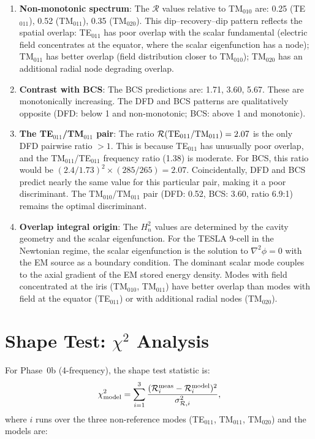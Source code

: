 \documentclass[11pt]{article}
\newcommand{\Heff}{H_n}
\theoremstyle{definition}
\theoremstyle{remark}
\begin{document}
\begin{enumerate}
\item \textbf{Non-monotonic spectrum}: The $\mathcal{R}$ values
  relative to TM$_{010}$ are: 0.25 (TE$_{011}$), 0.52 (TM$_{011}$),
  0.35 (TM$_{020}$). This dip--recovery--dip pattern reflects the
  spatial overlap: TE$_{011}$ has poor overlap with the scalar
  fundamental (electric field concentrates at the equator, where the
  scalar eigenfunction has a node); TM$_{011}$ has better overlap
  (field distribution closer to TM$_{010}$); TM$_{020}$ has an
  additional radial node degrading overlap.

\item \textbf{Contrast with BCS}: The BCS predictions are:
  1.71, 3.60, 5.67. These are monotonically increasing. The DFD
  and BCS patterns are qualitatively opposite (DFD: below 1 and
  non-monotonic; BCS: above 1 and monotonic).

\item \textbf{The TE$_{011}$/TM$_{011}$ pair}: The ratio
  $\mathcal{R}({\rm TE}_{011}/{\rm TM}_{011}) = 2.07$ is the only
  DFD pairwise ratio $> 1$. This is because TE$_{011}$ has unusually
  poor overlap, and the TM$_{011}$/TE$_{011}$ frequency ratio (1.38)
  is moderate. For BCS, this ratio would be
  $(2.4/1.73)^2 \times (285/265) = 2.07$. Coincidentally, DFD and
  BCS predict nearly the same value for this particular pair, making
  it a poor discriminant. The TM$_{010}$/TM$_{011}$ pair
  (DFD: 0.52, BCS: 3.60, ratio 6.9:1) remains the optimal
  discriminant.

\item \textbf{Overlap integral origin}: The $\Heff^2$ values
  are determined by the cavity geometry and the scalar eigenfunction.
  For the TESLA 9-cell in the Newtonian regime, the scalar
  eigenfunction is the solution to $\nabla^2 \phi = 0$ with the EM
  source as a boundary condition. The dominant scalar mode couples to
  the axial gradient of the EM stored energy density. Modes with
  field concentrated at the iris (TM$_{010}$, TM$_{011}$) have
  better overlap than modes with field at the equator (TE$_{011}$)
  or with additional radial nodes (TM$_{020}$).
\end{enumerate}


\section{Shape Test: $\chi^2$ Analysis}
\label{sec:shape-test}

For Phase~0b (4-frequency), the shape test statistic is:
\begin{equation}
\chi^2_{\rm model} = \sum_{i=1}^{3}
\frac{(\mathcal{R}_i^{\rm meas} - \mathcal{R}_i^{\rm model})^2}
{\sigma_{\mathcal{R},i}^2},
\end{equation}
where $i$ runs over the three non-reference modes (TE$_{011}$,
TM$_{011}$, TM$_{020}$) and the models are:
\end{document}
